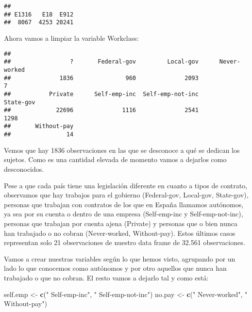 \documentclass[]{article}
\newenvironment{Shaded}{\begin{snugshade}}{\end{snugshade}}
\newcommand{\KeywordTok}[1]{\textcolor[rgb]{0.13,0.29,0.53}{\textbf{#1}}}
\newcommand{\NormalTok}[1]{#1}
\newcommand{\OperatorTok}[1]{\textcolor[rgb]{0.81,0.36,0.00}{\textbf{#1}}}
\newcommand{\StringTok}[1]{\textcolor[rgb]{0.31,0.60,0.02}{#1}}
\begin{document}
\begin{verbatim}
## 
## E1316   E18  E912 
##  8067  4253 20241
\end{verbatim}

Ahora vamos a limpiar la variable Workclass:

\begin{Shaded}
\end{Shaded}

\begin{verbatim}
## 
##                 ?       Federal-gov         Local-gov      Never-worked 
##              1836               960              2093                 7 
##           Private      Self-emp-inc  Self-emp-not-inc         State-gov 
##             22696              1116              2541              1298 
##       Without-pay 
##                14
\end{verbatim}

Vemos que hay 1836 observaciones en las que se desconoce a qué se
dedican los sujetos. Como es una cantidad elevada de momento vamos a
dejarlos como desconocidos.

Pese a que cada país tiene una legislación diferente en cuanto a tipos
de contrato, observamos que hay trabajos para el gobierno (Federal-gov,
Local-gov, State-gov), personas que trabajan con contratos de los que en
España llamamos autónomos, ya sea por su cuenta o dentro de una empresa
(Self-emp-inc y Self-emp-not-inc), personas que trabajan por cuenta
ajena (Private) y personas que o bien nunca han trabajado o no cobran
(Never-worked, Without-pay). Estos últimos casos representan solo 21
observaciones de nuestro data frame de 32.561 observaciones.

Vamos a crear nuestras variables según lo que hemos visto, agrupando por
un lado lo que conocemos como autónomos y por otro aquellos que nunca
han trabajado o que no cobran. El resto vamos a dejarlo tal y como está:

\begin{Shaded}
\begin{Highlighting}[]
\NormalTok{self.emp \textless{}{-}}\StringTok{ }\KeywordTok{c}\NormalTok{(}\StringTok{" Self{-}emp{-}inc"}\NormalTok{, }\StringTok{" Self{-}emp{-}not{-}inc"}\NormalTok{)}
\NormalTok{no.pay \textless{}{-}}\StringTok{ }\KeywordTok{c}\NormalTok{(}\StringTok{" Never{-}worked"}\NormalTok{, }\StringTok{" Without{-}pay"}\NormalTok{)}
\end{Highlighting}
\end{Shaded}
\end{document}
